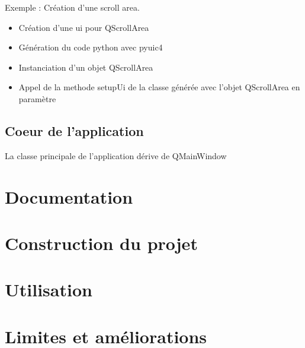 \documentclass[12pt,a4paper]{article}
\begin{document}
        Exemple : Création d'une scroll area.
        \begin{itemize}
            \item Création d'une ui pour QScrollArea
            \item Génération du code python avec pyuic4
            \item Instanciation d'un objet QScrollArea
            \item Appel de la methode setupUi de la classe générée avec l'objet QScrollArea en paramètre
        \end{itemize}
    \subsection{Coeur de l'application}
        La classe principale de l'application dérive de QMainWindow


\section{Documentation}

\section{Construction du projet}

\section{Utilisation}

\section{Limites et améliorations}
\end{document}
